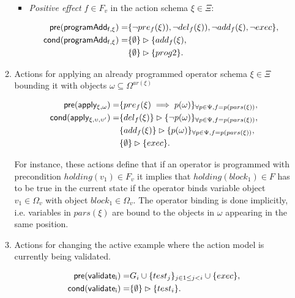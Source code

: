 \documentclass[letterpaper]{article} %
\newcommand{\pre}{\mathsf{pre}}     %
\newcommand{\cond}{\mathsf{cond}}   %
\begin{document}
\begin{itemize}
\begin{enumerate}
\begin{itemize}
\item {\em Positive effect} $f\in F_v$ in the action schema $\xi\in\Xi$:
\begin{small}
\begin{align*}
\hspace*{7pt}\pre(\mathsf{programAdd_{f,\xi}})=&\{\neg pre_{f}(\xi)),\neg del_{f}(\xi)),\neg add_{f}(\xi),\neg exec\},\\                                                   
\cond(\mathsf{programAdd_{f,\xi}})=&\{\emptyset\}\rhd\{add_{f}(\xi),\\
&\{\emptyset\}\rhd\{prog2\}.
\end{align*}
\end{small}
\end{itemize}

\item Actions for applying an already programmed operator schema $\xi\in\Xi$ bounding it with objects $\omega\subseteq\Omega^{ar(\xi)}$
\begin{small}
\begin{align*}
\hspace*{7pt}\pre(\mathsf{apply_{\xi,\omega}})=&\{pre_{f}(\xi)\implies p(\omega)\}_{\forall p\in\Psi,f=p(pars(\xi))},\\
\cond(\mathsf{apply_{\xi,\upsilon,\upsilon'}})=&\{del_{f}(\xi)\}\rhd\{\neg p(\omega)\}_{\forall p\in\Psi,f=p(pars(\xi))},\\
&\{add_{f}(\xi)\}\rhd\{p(\omega)\}_{\forall p\in\Psi,f=p(pars(\xi))},\\
&\{\emptyset\}\rhd\{exec\}.
\end{align*}
\end{small}

For instance, these actions define that if an operator is programmed with precondition $holding(v_1)\in F_v$ it implies that $holding(block_1)\in F$ has to be true in the current state if the operator binds variable object $v_1\in\Omega_v$ with object $block_1\in\Omega_v$. The operator binding is done implicitly, i.e. variables in $pars(\xi)$ are bound to the objects in $\omega$ appearing in the same position. 

\item Actions for changing the active example where the action model is currently being validated.
\begin{small}
\begin{align*}
\hspace*{7pt}\pre(\mathsf{validate_{i}})=&G_i\cup\{test_j\}_{j\in 1\leq j<i}\cup\{exec\},\\
\cond(\mathsf{validate_{i}})=&\{\emptyset\}\rhd\{test_i\}.
\end{align*}
\end{small}
\end{enumerate}
\end{itemize}
\end{document}
